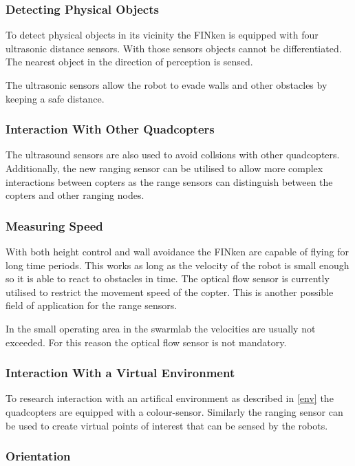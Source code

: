 \subsubsection*{Detecting Physical Objects}

To detect physical objects in its vicinity the FINken is equipped with four ultrasonic distance sensors.
With those sensors objects cannot be differentiated.
The nearest object in the direction of perception is sensed.

The ultrasonic sensors allow the robot to evade walls and other obstacles by keeping a safe distance.

\subsubsection*{Interaction With Other Quadcopters}

The ultrasound sensors are also used to avoid collsions with other quadcopters.
Additionally, the new ranging sensor can be utilised to allow more complex interactions between copters as the range sensors can distinguish between the copters and other ranging nodes.

\subsubsection*{Measuring Speed}

With both height control and wall avoidance the FINken are capable of flying for long time periods.
This works as long as the velocity of the robot is small enough so it is able to react to obstacles in time.
The optical flow sensor is currently utilised to restrict the movement speed of the copter. 
This is another possible field of application for the range sensors.

In the small operating area in the swarmlab the velocities are usually not exceeded.
For this reason the optical flow sensor is not mandatory.

\subsubsection*{Interaction With a Virtual Environment}

To research interaction with an artifical environment as described in \autoref{env} the quadcopters are equipped with a colour-sensor.
Similarly the ranging sensor can be used to create virtual points of interest that can be sensed by the robots.

\subsubsection*{Orientation}

